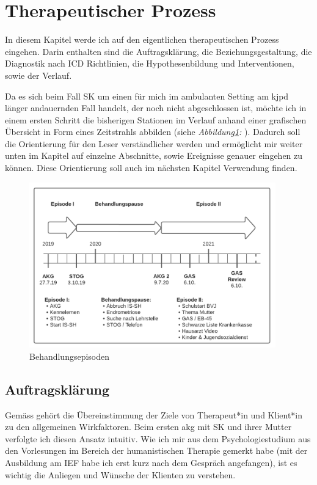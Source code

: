 \section{Therapeutischer Prozess}\label{Prozess}
In diesem Kapitel werde ich auf den eigentlichen therapeutischen Prozess eingehen. Darin enthalten sind die Auftragsklärung, die Beziehungsgestaltung, die Diagnostik nach ICD Richtlinien, die Hypothesenbildung und Interventionen, sowie der Verlauf.   

Da es sich beim Fall SK um einen für mich im ambulanten Setting am \ac{kjpd} länger andauernden Fall handelt, der noch nicht abgeschlossen ist, möchte ich in einem ersten Schritt die bisherigen Stationen im Verlauf anhand einer grafischen Übersicht in Form eines Zeitstrahls abbilden (siehe \textit{Abbildung\ref{fig:Behanldungsepisode}: }). Dadurch soll die Orientierung für den Leser verständlicher werden und ermöglicht mir weiter unten im Kapitel  auf einzelne Abschnitte, sowie Ereignisse genauer eingehen zu können. Diese Orientierung soll auch im nächsten Kapitel  Verwendung finden. 

\begin{figure} 
    \includegraphics[width=0.95\textwidth]{pictures/Zeitstrahl_Fall_SK.png}
    \caption{Behandlungsepisoden}
    \label{fig:Behanldungsepisode}
\end{figure}

\subsection{Auftragsklärung}\label{Auftragsklärung} 
Gemäss  gehört die Übereinstimmung der Ziele von Therapeut*in und Klient*in zu den allgemeinen Wirkfaktoren. Beim ersten \acf{akg} mit SK und ihrer Mutter verfolgte ich diesen Ansatz intuitiv. Wie ich mir aus dem Psychologiestudium aus den Vorlesungen im Bereich der humanistischen Therapie gemerkt habe (mit der Ausbildung am IEF habe ich erst kurz nach dem Gespräch angefangen), ist es wichtig die Anliegen und Wünsche der Klienten zu verstehen. 

